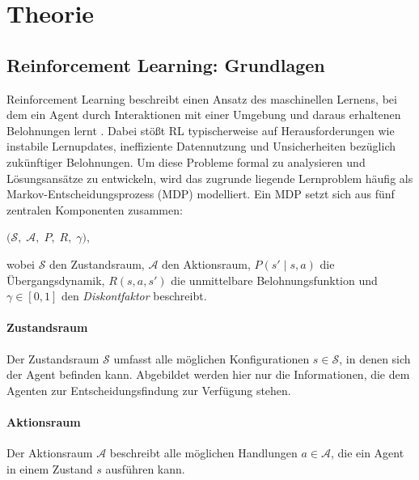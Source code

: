 \chapter{Theorie}
\label{chap:theorie}
\section{Reinforcement Learning: Grundlagen}

Reinforcement Learning beschreibt einen Ansatz des maschinellen Lernens, bei dem ein Agent durch Interaktionen mit einer Umgebung und daraus erhaltenen Belohnungen lernt \cite{sutton2018reinforcement}. Dabei stößt RL typischerweise auf Herausforderungen wie instabile Lernupdates, ineffiziente Datennutzung und Unsicherheiten bezüglich zukünftiger Belohnungen. Um diese Probleme formal zu analysieren und Lösungsansätze zu entwickeln, wird das zugrunde liegende Lernproblem häufig als Markov-Entscheidungsprozess (MDP) modelliert. Ein MDP setzt sich aus fünf zentralen Komponenten zusammen\cite{sutton2018reinforcement}:
\begin{center}
$\bigl(\mathcal{S},\;\mathcal{A},\;P,\;R,\;\gamma\bigr)$,
\end{center}

\noindent
wobei \(\mathcal{S}\) den Zustandsraum, \(\mathcal{A}\) den Aktionsraum,  
\(P(s' \mid s,a)\) die Übergangsdynamik, \(R(s,a,s')\) die unmittelbare  
Belohnungsfunktion und \(\gamma \in [0,1]\) den \emph{Diskontfaktor} beschreibt.  


\subsubsection*{Zustandsraum}
\vspace{-1em}
Der Zustandsraum \(\mathcal{S}\) umfasst alle möglichen Konfigurationen \(s \in \mathcal{S}\), in denen sich der Agent befinden kann. Abgebildet werden hier nur die Informationen, die dem Agenten zur Entscheidungsfindung zur Verfügung stehen.

\subsubsection*{Aktionsraum}
\vspace{-1em}
Der Aktionsraum \(\mathcal{A}\) beschreibt alle möglichen Handlungen \(a \in \mathcal{A}\), die ein Agent in einem Zustand \(s\) ausführen kann.

